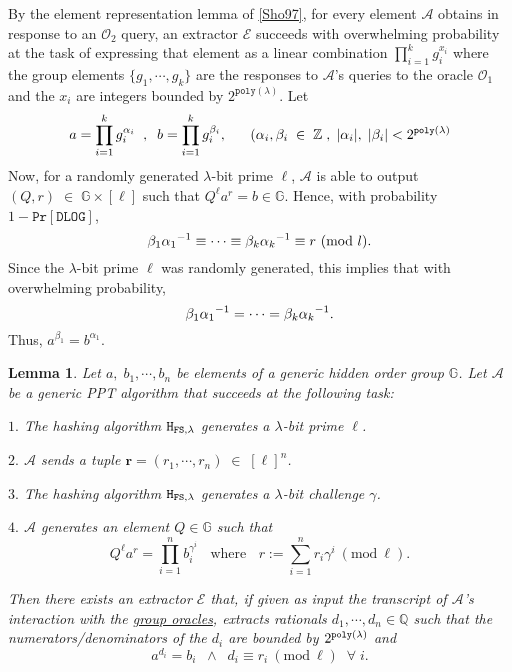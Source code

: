\documentclass[11pt, lettersize, notitlepage, leqno, footskip=0.6cm]{article}
\newcommand{\bz}{\mathbb Z}
\newcommand{\bq}{\mathbb Q}
\newcommand{\pl}{\prod\limits}
\newcommand{\slim}{\sum\limits}
\newcommand{\ttt}{\texttt}
\newcommand{\bG}{\mathbb{G}}
\newcommand{\mc}{\mathcal}
\newcommand{\mb}{\mathbb}
\newcommand{\mbf}{\mathbf}
\newcommand{\al}{\alpha}
\newcommand{\be}{\beta}
\newcommand{\lam}{\lambda}
\newcommand{\A}{\mc{A}}
\newcommand{\vs}{\vspace{-0.15cm}}
\newcommand{\noin}{\noindent}
\newcommand{\op}{overwhelming probability}
\newcommand{\Mod}[1]{\ (\mathrm{mod}\ #1)}
\newcommand{\E}{\mc{E}}
\newtheorem{Lem}[Thm]{Lemma}
\numberwithin{equation}{section}
\begin{document}
\begin{prf} By the element representation lemma of \hyperlink{Sho97}{[Sho97]}, for every element $\mc{A}$ obtains in response to an $\mc{O}_2$ query, an extractor $\E$ succeeds with overwhelming probability at the task of expressing that element as a linear combination $\prod_{i=1}^k g_i^{x_i}$ where the group elements $\{g_1,\cdots,g_k\}$ are the responses to $\A$'s queries to the oracle $\mc{O}_1$ and the $x_i$ are integers bounded by $2^{\ttt{poly}(\lam)}$. Let \vspace{-0.3cm} $$a = \pl_{i=1}^k g_i^{\al_i}\;\;,\;\; b = \pl_{i=1}^k g_i^{\be_i},\;\;\;\;\;\;(\al_i,\be_i\;\in\;\bz\;,\;|\al_i|,\;|\be_{i}| < 2^{\ttt{poly}(\lam)}\vs $$ Now, for a randomly generated $\lam$-bit prime $\ell$, $\mc{A}$ is able to output $(Q, r)\; \in\;\bG \times [\ell]$ such that $Q^{\ell}a^r = b\in \bG$. Hence, with probability $1-\ttt{Pr}[\ttt{DLOG}]$,  \vs $${\be_1}{\al_1}^{-1}\equiv\cdots\equiv {\be_k}{\al_k}^{-1}\equiv r \Mod{l}.\vs $$ Since the $\lam$-bit prime $\ell$ was randomly generated, this implies that with \op, \vs $${\be_1}{\al_1}^{-1} = \cdots =  {\be_k}{\al_k}^{-1}.\vs $$ Thus, $a^{\be_1} = b^{\al_1}$. \end{prf}
\vspace{0.1cm}



\begin{Lem} \label{aggroot} Let $a,\; b_1,\cdots,b_n$ be elements of a generic hidden order group $\bG$. Let $\mc{A}$ be a generic PPT algorithm that succeeds at the following task:

\noin $1.$ The hashing algorithm ${\tt{H}}_{{\tt{FS}},\lam}$ generates a $\lam$-bit prime $\ell$.

\noin $2.$ $\mc{A}$ sends a tuple $\mbf{r} = (r_1,\cdots,r_n)\;\in\; [\ell]^n$.

\noin $3.$ The hashing algorithm ${\tt{H}}_{{\tt{FS}},\lam}$ generates a $\lam$-bit challenge $\gamma$.

\noin $4.$ $\mc{A}$ generates an element $Q\in \mb{G}$ such that \vs $$Q^{\ell}a^r = \pl_{i=1}^n b_i^{\gamma^i}\;\;\text{ where }\;\; r:= \slim_{i=1}^n r_i\gamma^i\Mod{\ell}.$$

\noin Then there exists an extractor \hspace{0.05cm}$\E$ that, if given as input the transcript of $\A$'s interaction with the \hyperlink{Oracles}{group oracles}, extracts rationals $d_1,\cdots,d_n\in\bq$ such that the numerators/denominators of the $d_i$ are bounded by $2^{\tt{poly}(\lam)}$ and \vs $$a^{d_i} = b_i \;\;\wedge\;\; d_i\equiv r_i\Mod{\ell}\;\;\forall\;i.$$ \end{Lem} 
\end{document}
